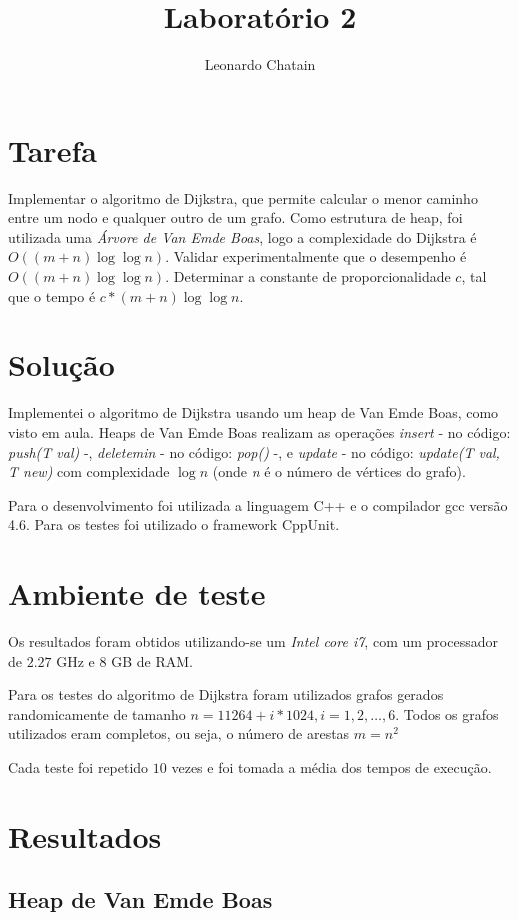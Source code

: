 \documentclass{article}
\title{Laboratório 2}
\author{Leonardo Chatain}
\begin{document}
\maketitle

\section{Tarefa}
Implementar o algoritmo de Dijkstra, que permite calcular o menor caminho entre um nodo e qualquer outro de um grafo. Como estrutura de heap, foi utilizada uma \emph{Árvore de Van Emde Boas}, logo a complexidade do Dijkstra é $O((m + n) \log\log n)$. Validar experimentalmente que o desempenho é $O((m + n) \log\log n)$. Determinar a constante de proporcionalidade $c$, tal que o tempo é $c*(m + n) \log\log n$.

\section{Solução}
Implementei o algoritmo de Dijkstra usando um heap de Van Emde Boas, como visto em aula. Heaps de Van Emde Boas realizam as operações \emph{insert} - no código: \emph{push(T val)} -, \emph{deletemin} - no código: \emph{pop()} -, e \emph{update} - no código: \emph{update(T val, T new)} com complexidade $ \log n $ (onde \emph{n} é o número de vértices do grafo).

Para o desenvolvimento foi utilizada a linguagem C++ e o compilador gcc versão 4.6. Para os testes foi utilizado o framework CppUnit.

\section{Ambiente de teste}

Os resultados foram obtidos utilizando-se um \emph{Intel core i7}, com um processador de $2.27$ GHz e $8$ GB de RAM.

Para os testes do algoritmo de Dijkstra foram utilizados grafos gerados randomicamente de tamanho $n=11264 + i * 1024, i = 1, 2, \ldots, 6$. Todos os grafos utilizados eram completos, ou seja, o número de arestas $m=n ^ 2$

Cada teste foi repetido $10$ vezes e foi tomada a média dos tempos de execução.

\section{Resultados}

\subsection{Heap de Van Emde Boas}
\end{document}

